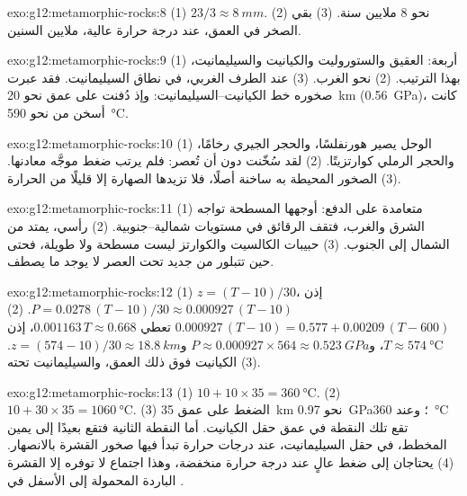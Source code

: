 \begin{solution}{exo:g12:metamorphic-rocks:8}
(1) $23/3 \approx \qty{8}{mm}$. (2) نحو 8 ملايين سنة. (3) بقي الصخر
في العمق، عند درجة حرارة عالية، ملايين السنين.
\end{solution}

\begin{solution}{exo:g12:metamorphic-rocks:9}
(1) أربعة:  العقيق والستوروليت والكيانيت والسيليمانيت، بهذا
الترتيب. (2) نحو الغرب. (3) عند الطرف الغربي، في نطاق السيليمانيت. فقد
عبرت صخوره خط الكيانيت--السيليمانيت: وإذ دُفنت على عمق نحو \qty{20}{km}
(\qty{0.56}{GPa})، كانت أسخن من نحو \qty{590}{\celsius}.
\end{solution}

\begin{solution}{exo:g12:metamorphic-rocks:10}
(1) الوحل يصير هورنفلسًا، والحجر الجيري رخامًا، والحجر الرملي
كوارتزيتًا. (2) لقد سُخّنت دون أن تُعصر: فلم يرتب ضغط موجَّه
معادنها. (3) الصخور المحيطة به ساخنة أصلًا، فلا تزيدها
الصهارة إلا قليلًا من الحرارة.
\end{solution}

\begin{solution}{exo:g12:metamorphic-rocks:11}
(1) متعامدة على الدفع: أوجهها المسطحة تواجه الشرق والغرب، فتقف الرقائق
في مستويات شمالية--جنوبية. (2) رأسي، يمتد من الشمال إلى الجنوب.
(3) حبيبات الكالسيت والكوارتز ليست مسطحة ولا طويلة، فحتى حين
تتبلور من جديد تحت العصر لا يوجد ما يصطف.
\end{solution}

\begin{solution}{exo:g12:metamorphic-rocks:12}
(1) $z = (T - 10)/30$، إذن $P = 0.0278\,(T - 10)/30 \approx
0.000927\,(T - 10)$. (2) $0.000927\,(T - 10) = 0.577 + 0.00209\,(T - 600)$
تعطي $0.001163\,T \approx 0.668$، إذن $T \approx \qty{574}{\celsius}$، و$P
\approx 0.000927 \times 564 \approx \qty{0.523}{GPa}$ و$z = (574 - 10)/30
\approx \qty{18.8}{km}$. (3) الكيانيت فوق ذلك العمق، والسيليمانيت تحته.
\end{solution}

\begin{solution}{exo:g12:metamorphic-rocks:13}
(1) $10 + 10 \times 35 = \qty{360}{\celsius}$. (2) $10 + 30 \times 35 =
\qty{1060}{\celsius}$. (3) الضغط على عمق \qty{35}{km} نحو
\qty{0.97}{GPa}؛ وعند \qty{360}{\celsius} تقع تلك النقطة في عمق حقل
الكيانيت. أما النقطة الثانية فتقع بعيدًا إلى يمين المخطط، في حقل
السيليمانيت، عند درجات حرارة تبدأ فيها صخور القشرة بالانصهار.
(4) يحتاجان إلى ضغط عالٍ عند درجة حرارة منخفضة، وهذا اجتماع لا
توفره إلا القشرة الباردة المحمولة إلى الأسفل في .
\end{solution}

